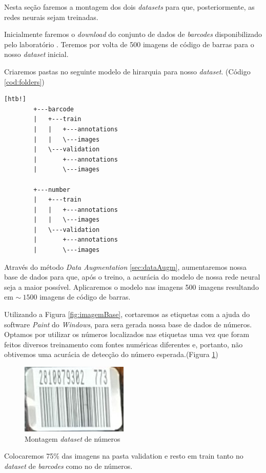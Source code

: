 Nesta seção faremos a montagem dos dois \textit{datasets} para que, posteriormente, as redes neurais sejam treinadas. 

Inicialmente faremos o \textit{download} do conjunto de dados de \textit{barcodes} disponibilizado pelo laboratório \citeauthor{Arte-Lab}. Teremos por volta de 500 imagens de código de barras para o nosso \textit{dataset} inicial.

Criaremos pastas no seguinte modelo de hirarquia para nosso \textit{dataset}. (Código \ref{cod:folders})
\begin{lstlisting}[caption=Hierarquia de pastas para dataset, label=cod:folders][htb!]
        +---barcode
        |   +---train
        |   |   +---annotations
        |   |   \---images
        |   \---validation
        |       +---annotations
        |       \---images
        
        +---number
        |   +---train
        |   |   +---annotations
        |   |   \---images
        |   \---validation
        |       +---annotations
        |       \---images
\end{lstlisting}

Através do método \textit{Data Augmentation} \ref{sec:dataAugm}, aumentaremos nossa base de dados para que, após o treino, a acurácia do modelo de nossa rede neural seja a maior possível. Aplicaremos o modelo nas imagens 500 imagens resultando em $\sim~1500$ imagens de código de barras.

Utilizando a Figura \ref{fig:imagemBase}, cortaremos as etiquetas com a ajuda do software \textit{Paint} do \textit{Windows}, para sera gerada nossa base de dados de números. Optamos por utilizar os números localizados nas etiquetas uma vez que foram feitos diversos treinamento com fontes numéricas diferentes e, portanto, não obtivemos uma acurácia de detecção do número esperada.(Figura \ref{fig:barcodeDataset})

\begin{figure}[htbp]
	\centering
	\includegraphics[width=0.25\linewidth]{figuras/MachineLearning/barcodeDataset.png}
	\caption{Montagem \textit{dataset} de números}
	\label{fig:barcodeDataset}
\end{figure}

Colocaremos 75\% das imagens na pasta validation e resto em train tanto no \textit{dataset} de \textit{barcodes} como no de números.

